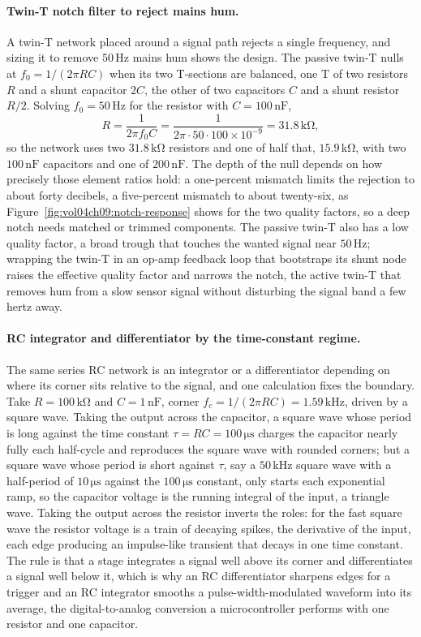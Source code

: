 \paragraph{Twin-T notch filter to reject mains hum.}
A twin-T network placed around a signal path rejects a single frequency, and
sizing it to remove $50\,\si{\hertz}$ mains hum shows the design. The passive
twin-T nulls at $f_0 = 1/(2\pi RC)$ when its two T-sections are balanced, one T
of two resistors $R$ and a shunt capacitor $2C$, the other of two capacitors $C$
and a shunt resistor $R/2$. Solving $f_0 = 50\,\si{\hertz}$ for the resistor with
$C = 100\,\si{\nano\farad}$,
\[
R = \frac{1}{2\pi f_0 C}
= \frac{1}{2\pi\cdot 50\cdot 100\times 10^{-9}}
= 31.8\,\si{\kilo\ohm},
\]
so the network uses two $31.8\,\si{\kilo\ohm}$ resistors and one of half that,
$15.9\,\si{\kilo\ohm}$, with two $100\,\si{\nano\farad}$ capacitors and one of
$200\,\si{\nano\farad}$. The depth of the null depends on how precisely those
element ratios hold: a one-percent mismatch limits the rejection to about forty
decibels, a five-percent mismatch to about twenty-six, as
Figure~\ref{fig:vol04ch09:notch-response} shows for the two quality factors, so
a deep notch needs matched or trimmed components. The passive twin-T also has a
low quality factor, a broad trough that touches the wanted signal near
$50\,\si{\hertz}$; wrapping the twin-T in an op-amp feedback loop that
bootstraps its shunt node raises the effective quality factor and narrows the
notch, the active twin-T that removes hum from a slow sensor signal without
disturbing the signal band a few hertz away.

\paragraph{RC integrator and differentiator by the time-constant regime.}
The same series RC network is an integrator or a differentiator depending on
where its corner sits relative to the signal, and one calculation fixes the
boundary. Take $R = 100\,\si{\kilo\ohm}$ and $C = 1\,\si{\nano\farad}$, corner
$f_c = 1/(2\pi RC) = 1.59\,\si{\kilo\hertz}$, driven by a square wave. Taking
the output across the capacitor, a square wave whose period is long against the
time constant $\tau = RC = 100\,\si{\micro\second}$ charges the capacitor nearly
fully each half-cycle and reproduces the square wave with rounded corners; but a
square wave whose period is short against $\tau$, say a $50\,\si{\kilo\hertz}$
square wave with a half-period of $10\,\si{\micro\second}$ against the
$100\,\si{\micro\second}$ constant, only starts each exponential ramp, so the
capacitor voltage is the running integral of the input, a triangle wave. Taking
the output across the resistor inverts the roles: for the fast square wave the
resistor voltage is a train of decaying spikes, the derivative of the input,
each edge producing an impulse-like transient that decays in one time constant.
The rule is that a stage integrates a signal well above its corner and
differentiates a signal well below it, which is why an RC differentiator sharpens
edges for a trigger and an RC integrator smooths a pulse-width-modulated
waveform into its average, the digital-to-analog conversion a microcontroller
performs with one resistor and one capacitor.

